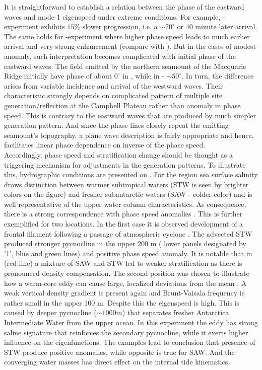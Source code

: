 \documentclass[12pt]{article}
\begin{document}
It is straightforward to establish a relation between the phase of the eastward waves and mode-1 
eigenspeed under extreme conditions. For example, -experiment exhibits $15\%$ slower 
progression, i.e. a $\sim 20^{\circ}$ or $40$ minute later arrival. The same holds for 
-experiment where higher phase speed leads to much earlier arrival and very strong 
enhancement (compare  with ). But in the 
cases of modest anomaly, such interpretation becomes complicated with initial 
phase of the eastward waves. The field emitted by the northern seamount of the 
Macquarie Ridge initially have phase of about $0^{\circ}$ in , while in  - 
$\sim 50^{\circ}$. In turn, the difference arises from variable incidence and arrival of the 
westward waves. Their characteristic strongly depends on complicated pattern of multiple site 
generation/reflection at the Campbell Plateau rather than anomaly in phase speed. This is contrary 
to the 
eastward waves that are produced by much simpler generation pattern. And since the phase lines 
closely repeat the emitting seamount's topography, a plane wave description is fairly appropriate 
and hence, facilitates linear phase dependence on inverse of the phase speed.\\

Accordingly, phase speed and stratification change should be thought as a triggering mechanism for 
adjustments in the generation patterns. To illustrate this, hydrographic conditions are presented 
on . For the region sea surface salinity draws distinction between warmer 
subtropical waters (STW is seen by brighter colors on the figure) and fresher subantarctic waters 
(SAW - colder color) and is well representative of the upper water column characteristics. As 
consequence, there is a strong correspondence with phase speed anomalies 
. This is further exemplified for two locations. In the 
first case it is observed development of a frontal filament following a passage of atmospheric 
cyclone . The advected STW produced stronger pycnocline in the 
upper 
200 m ( lower panels designated by '1', blue and green lines) and positive 
phase speed anomaly. It is notable that in  (red line) a mixture of SAW and STW led to 
weaker stratification as there is pronounced density compensation. The second position was chosen 
to illustrate how a warm-core eddy can cause large, localized deviations from the mean 
. A weak vertical density gradient is present again and 
Brunt-Vaisala frequency is rather small in the upper 100 m. Despite this the eigenspeed is high. 
This is caused by deeper pycnocline ($\sim 1000m$) that separates fresher Antarctica Intermediate 
Water \citep{chiswell2015physical} from the upper ocean. In this experiment the eddy has strong 
saline signature that reinforces the secondary pycnocline, while it exerts higher 
influence on the eigenfunctions. The examples lead to conclusion that presence of STW produce 
positive anomalies, while opposite is true for SAW. And the converging water masses has 
direct effect on the internal tide kinematics.
\end{document}
